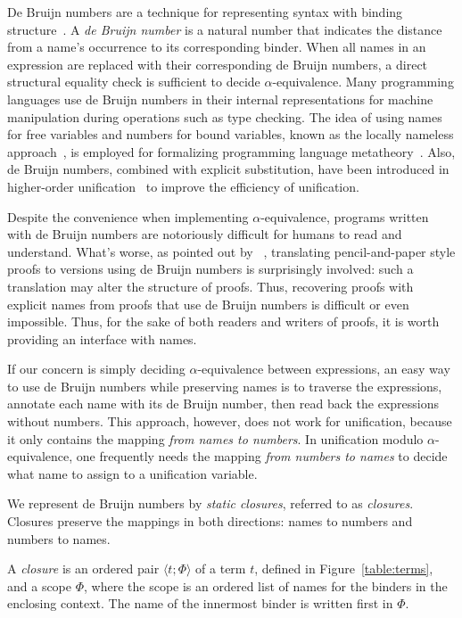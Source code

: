 \documentclass[a4paper,UKenglish]{lipics-v2016}
\newcommand{\clos}[2] {
  \langle #1; #2 \rangle
}
\begin{document}
De Bruijn numbers are a technique for representing syntax with binding
structure~\citep{de_bruijn_lambda_1972}.  A \emph{de Bruijn number} is
a natural number that indicates the distance from a name's occurrence
to its corresponding binder.  When all names in an expression are
replaced with their corresponding de Bruijn numbers, a direct
structural equality check is sufficient to decide
$\alpha$-equivalence. Many programming languages use de Bruijn numbers
in their internal representations for machine manipulation during
operations such as type checking.  The idea of using names for free
variables and numbers for bound variables, known as the locally
nameless approach~\citep{chargueraud_locally_2012}, is employed for
formalizing programming language metatheory~\citep{aydemir_nominal_2006,
  aydemir_engineering_2008}.  Also, de Bruijn numbers, combined with
explicit substitution, have been introduced in higher-order
unification~\citep{dowek_higher_2000} to improve the efficiency of
unification.

Despite the convenience when implementing $\alpha$-equivalence,
programs written with de Bruijn numbers are notoriously difficult for
humans to read and understand.  What's worse, as pointed out by
~\citet{berghofer_head--head_2007}, translating
pencil-and-paper style proofs to versions using de Bruijn numbers is
surprisingly involved: such a translation may alter the structure of
proofs. Thus, recovering proofs with explicit names from proofs that use de
Bruijn numbers is difficult or even impossible.  Thus, for the sake of
both readers and writers of proofs, it is worth providing an interface
with names.

If our concern is simply deciding $\alpha$-equivalence between
expressions, an easy way to use de Bruijn numbers while preserving
names is to traverse the expressions, annotate each name with its de
Bruijn number, then read back the expressions without numbers.  This
approach, however, does not work for unification, because it only
contains the mapping \emph{from names to numbers}.  In unification
modulo $\alpha$-equivalence, one frequently needs the mapping
\emph{from numbers to names} to decide what name to assign to a
unification variable.

We represent de Bruijn numbers by \emph{static closures},
referred to as \emph{closures}.  Closures preserve the
mappings in both directions: names to numbers and numbers to names.

\begin{definition}
  A \emph{closure} is an ordered pair $\clos{t}{\Phi}$ of a term $t$,
  defined in Figure~\ref{table:terms}, and a scope $\Phi$, where the
  scope is an ordered list of names for the binders in the enclosing
  context. The name of the innermost binder is written first in $\Phi$.
\end{definition}
\end{document}
